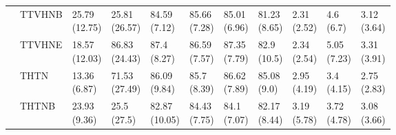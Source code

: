 \begin{table}
\begin{tabular}{lllllllllll}
       & TTVHNB &  \makecell{25.79\\(12.75)} &  \makecell{25.81\\(26.57)} &   \makecell{84.59\\(7.12)} &  \makecell{85.66\\(7.28)} &  \makecell{85.01\\(6.96)} &   \makecell{81.23\\(8.65)} &      \makecell{2.31\\(2.52)} &    \makecell{4.6\\(6.7)} &  \makecell{3.12\\(3.64)} \\
       & TTVHNE &  \makecell{18.57\\(12.03)} &  \makecell{86.83\\(24.43)} &    \makecell{87.4\\(8.27)} &  \makecell{86.59\\(7.57)} &  \makecell{87.35\\(7.79)} &    \makecell{82.9\\(10.5)} &      \makecell{2.34\\(2.54)} &  \makecell{5.05\\(7.23)} &  \makecell{3.31\\(3.91)} \\
       & THTN &   \makecell{13.36\\(6.87)} &  \makecell{71.53\\(27.49)} &   \makecell{86.09\\(9.84)} &   \makecell{85.7\\(8.39)} &  \makecell{86.62\\(7.89)} &    \makecell{85.08\\(9.0)} &      \makecell{2.95\\(4.19)} &   \makecell{3.4\\(4.15)} &  \makecell{2.75\\(2.83)} \\
       & THTNB &   \makecell{23.93\\(9.36)} &    \makecell{25.5\\(27.5)} &  \makecell{82.87\\(10.05)} &  \makecell{84.43\\(7.75)} &   \makecell{84.1\\(7.07)} &   \makecell{82.17\\(8.44)} &      \makecell{3.19\\(5.78)} &  \makecell{3.72\\(4.78)} &  \makecell{3.08\\(3.66)} \\

\end{tabular}
\end{table}
